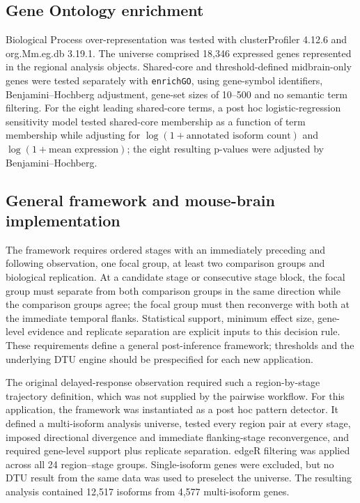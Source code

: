 \documentclass[11pt,a4paper]{article}
\begin{document}
\subsection{Gene Ontology enrichment}

Biological Process over-representation was tested with clusterProfiler 4.12.6 and org.Mm.eg.db 3.19.1. The universe comprised 18,346 expressed genes represented in the regional analysis objects. Shared-core and threshold-defined midbrain-only genes were tested separately with \texttt{enrichGO}, using gene-symbol identifiers, Benjamini--Hochberg adjustment, gene-set sizes of 10--500 and no semantic term filtering. For the eight leading shared-core terms, a post hoc logistic-regression sensitivity model tested shared-core membership as a function of term membership while adjusting for $\log(1+\text{annotated isoform count})$ and $\log(1+\text{mean expression})$; the eight resulting p-values were adjusted by Benjamini--Hochberg.

\subsection{General framework and mouse-brain implementation}

The framework requires ordered stages with an immediately preceding and following observation, one focal group, at least two comparison groups and biological replication. At a candidate stage or consecutive stage block, the focal group must separate from both comparison groups in the same direction while the comparison groups agree; the focal group must then reconverge with both at the immediate temporal flanks. Statistical support, minimum effect size, gene-level evidence and replicate separation are explicit inputs to this decision rule. These requirements define a general post-inference framework; thresholds and the underlying DTU engine should be prespecified for each new application.

The original delayed-response observation required such a region-by-stage trajectory definition, which was not supplied by the pairwise workflow. For this application, the framework was instantiated as a post hoc pattern detector. It defined a multi-isoform analysis universe, tested every region pair at every stage, imposed directional divergence and immediate flanking-stage reconvergence, and required gene-level support plus replicate separation. edgeR filtering \citep{robinson_edger_2010} was applied across all 24 region--stage groups. Single-isoform genes were excluded, but no DTU result from the same data was used to preselect the universe. The resulting analysis contained 12,517 isoforms from 4,577 multi-isoform genes.
\end{document}
